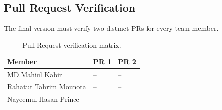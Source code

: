 \documentclass{iutbscthesis}
\begin{document}
\begin{appendices}
\section{Pull Request Verification}
The final version must verify two distinct PRs for every team member.
\begin{table}[H]
\centering
\begin{tabular}{p{}p{}p{}}
\toprule
\textbf{Member} & \textbf{PR 1} & \textbf{PR 2} \\
\midrule
MD.Mahiul Kabir & -- & -- \\
Rahatut Tahrim Mounota & -- & -- \\
Nayeemul Hasan Prince & -- & -- \\
\bottomrule
\end{tabular}
\caption{Pull Request verification matrix.}
\label{tab:pr-verification}
\end{table}


\end{appendices}
\end{document}
